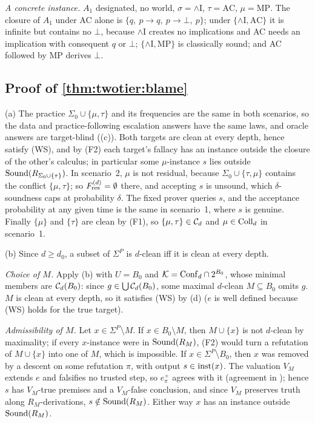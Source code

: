 \emph{A concrete instance.} $A_1$ designated, no world, $\sigma=\wedge\mathrm I$, $\tau=\mathrm{AC}$, $\mu=\mathrm{MP}$. The closure of $A_1$ under AC alone is $\{q,\ p\to q,\ p\to\bot,\ p\}$; under $\{\wedge\mathrm I,\mathrm{AC}\}$ it is infinite but contains no $\bot$, because $\wedge$I creates no implications and AC needs an implication with consequent $q$ or $\bot$; $\{\wedge\mathrm I,\mathrm{MP}\}$ is classically sound; and AC followed by MP derives $\bot$.

\subsection{Proof of \texorpdfstring{\cref{thm:twotier:blame}}{the blame theorem}}\label{app:twotier:blame}

(a) The practice $\Sigma_0\cup\{\mu,\tau\}$ and its frequencies are the same in both scenarios, so the data and practice-following escalation answers have the same laws, and oracle answers are target-blind ((c)). Both targets are clean at every depth, hence satisfy (WS), and by (F2) each target's fallacy has an instance outside the closure of the other's calculus; in particular some $\mu$-instance $s$ lies outside $\mathrm{Sound}(R_{\Sigma_0\cup\{\tau\}})$. In scenario~2, $\mu$ is not residual, because $\Sigma_0\cup\{\tau,\mu\}$ contains the conflict $\{\mu,\tau\}$; so $F^{(d)}_{\mathrm{res}}=\emptyset$ there, and accepting $s$ is unsound, which $\delta$-soundness caps at probability $\delta$. The fixed prover queries $s$, and the acceptance probability at any given time is the same in scenario~1, where $s$ is genuine. Finally $\{\mu\}$ and $\{\tau\}$ are clean by (F1), so $\{\mu,\tau\}\in\mathcal{C}_d$ and $\mu\in\mathrm{Coll}_d$ in scenario~1.

(b) Since $d\ge d_0$, a subset of $\Sigma^P$ is $d$-clean iff it is clean at every depth.

\emph{Choice of $M$.} Apply (b) with $U=B_0$ and $\mathcal K=\mathrm{Conf}_d\cap2^{B_0}$, whose minimal members are $\mathcal{C}_d(B_0)$: since $g\in\bigcup\mathcal{C}_d(B_0)$, some maximal $d$-clean $M\subseteq B_0$ omits $g$. $M$ is clean at every depth, so it satisfies (WS) by (d) ($e$ is well defined because (WS) holds for the true target).

\emph{Admissibility of $M$.} Let $x\in\Sigma^P\setminus M$. If $x\in B_0\setminus M$, then $M\cup\{x\}$ is not $d$-clean by maximality; if every $x$-instance were in $\mathrm{Sound}(R_M)$, (F2) would turn a refutation of $M\cup\{x\}$ into one of $M$, which is impossible. If $x\in\Sigma^P\setminus B_0$, then $x$ was removed by a descent on some refutation $\pi$, with output $s\in\mathrm{inst}(x)$. The valuation $V_M$ extends $e$ and falsifies no trusted step, so $e^+_\pi$ agrees with it (agreement in ); hence $s$ has $V_M$-true premises and a $V_M$-false conclusion, and since $V_M$ preserves truth along $R_M$-derivations, $s\notin\mathrm{Sound}(R_M)$. Either way $x$ has an instance outside $\mathrm{Sound}(R_M)$.

